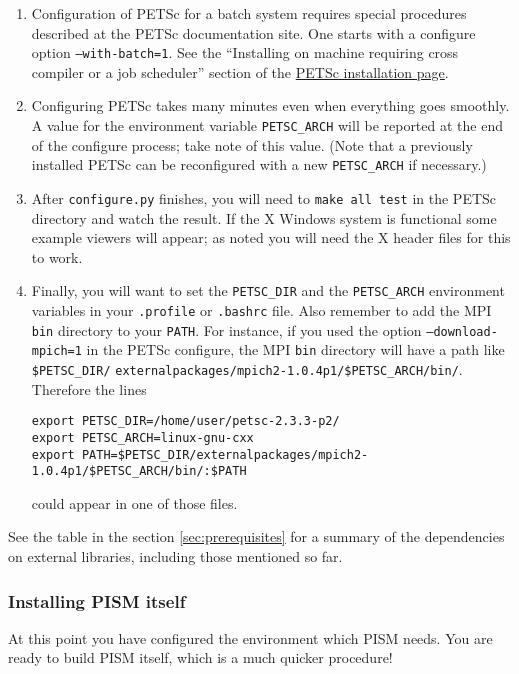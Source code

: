 \documentclass[11pt,final]{amsart}
\begin{document}
\begin{enumerate}
\begin{enumerate}
\item Configuration of PETSc for a batch system requires special procedures described at the PETSc documentation site.  One starts with a configure option \texttt{--with-batch=1}.  See the ``Installing on machine requiring cross compiler or a job scheduler'' section of the \href{http://www-unix.mcs.anl.gov/petsc/petsc-2/documentation/installation.html}{PETSc installation page}.

\item  Configuring PETSc takes many minutes even when everything goes smoothly.   A value for the environment variable \texttt{PETSC_ARCH} will be reported at the end of the configure process; take note of this value.  (Note that a previously installed PETSc can be reconfigured with a new \texttt{PETSC_ARCH} if necessary.)

\item  After \texttt{configure.py} finishes, you will need to \texttt{make all test} in the PETSc directory and watch the result.  If the X Windows system is functional some example viewers will appear; as noted you will need the X header files for this to work.

\item Finally, you will want to set the \texttt{PETSC_DIR} and the \texttt{PETSC_ARCH} environment variables in your \texttt{.profile} or \texttt{.bashrc} file.  Also remember to add the MPI \texttt{bin} directory to your \texttt{PATH}.  For instance, if you used the option \texttt{--download-mpich=1} in the PETSc configure, the MPI \texttt{bin} directory will have a path like \texttt{\$PETSC_DIR/} \texttt{externalpackages/mpich2-1.0.4p1/\$PETSC_ARCH/bin/}.  Therefore the lines 
\begin{verbatim}
export PETSC_DIR=/home/user/petsc-2.3.3-p2/
export PETSC_ARCH=linux-gnu-cxx
export PATH=$PETSC_DIR/externalpackages/mpich2-1.0.4p1/$PETSC_ARCH/bin/:$PATH
\end{verbatim}
\noindent could appear in one of those files.
\end{enumerate}
\end{enumerate}
\medskip See the table in the section \ref{sec:prerequisites} for a summary of the dependencies on external libraries, including
those mentioned so far.

\subsubsection{Installing PISM itself}
\label{sec:install-cmake}
At this point you have configured the environment which PISM needs.  You are ready to build PISM itself, which is a much quicker procedure!
\end{document}
